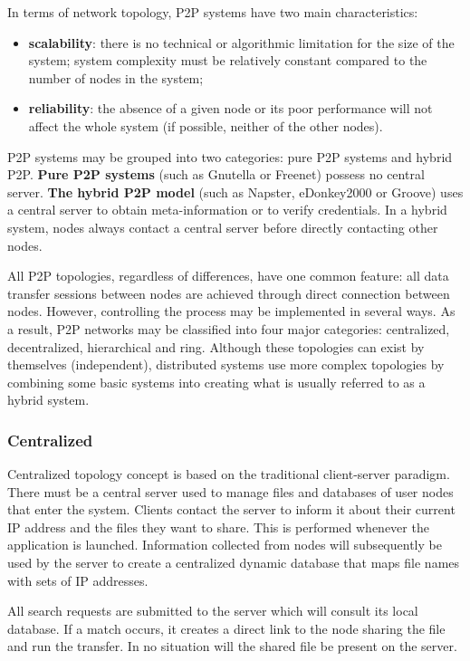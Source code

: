 In terms of network topology, P2P systems have two main characteristics:

\begin{itemize}
  \item \textbf{scalability}: there is no technical or algorithmic limitation
  for the size of the system; system complexity must be relatively constant
  compared to the number of nodes in the system;
  \item \textbf{reliability}: the absence of a given node or its poor
  performance will not affect the whole system (if possible, neither of the
  other nodes).
\end{itemize}

P2P systems may be grouped into two categories: pure P2P systems and hybrid
P2P. \textbf{Pure P2P systems} (such as Gnutella or Freenet) possess no
central server. \textbf{The hybrid P2P model} (such as Napster, eDonkey2000 or
Groove) uses a central server to obtain meta-information or to verify
credentials. In a hybrid system, nodes always contact a central server before
directly contacting other nodes.

All P2P topologies, regardless of differences, have one common feature: all
data transfer sessions between nodes are achieved through direct connection
between nodes. However, controlling the process may be implemented in several
ways. As a result, P2P networks may be classified into four major categories:
centralized, decentralized, hierarchical and ring. Although these topologies
can exist by themselves (independent), distributed systems use more complex
topologies by combining some basic systems into creating what is usually
referred to as a hybrid system.

\subsubsection{Centralized}

Centralized topology concept is based on the traditional client-server
paradigm. There must be a central server used to manage files and databases
of user nodes that enter the system. Clients contact the server to
inform it about their current IP address and the files they want to share.
This is performed whenever the application is launched. Information collected
from nodes will subsequently be used by the server to create a centralized
dynamic database that maps file names with sets of IP addresses.

All search requests are submitted to the server which will consult its local
database. If a match occurs, it creates a direct link to the node sharing the
file and run the transfer. In no situation will the shared file be present on
the server.

